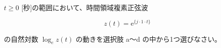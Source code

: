$t \ge 0$ [秒]の範囲において、時間領域複素正弦波 

\[
z(t) =  \textrm{e}^{\{ j \cdot 1 \cdot t \}}
\]

\bigskip
\noindent の自然対数 $\log_e z(t)$ の動きを選択肢 a〜d の中から1つ選びなさい。
